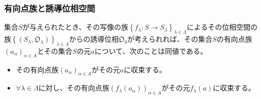 \documentclass[dvipdfmx]{jsarticle}
\begin{document}
\subsubsection{有向点族と誘導位相空間}%
\begin{thm}\label{8.1.9.10}
集合$S$が与えられたとき、その写像の族$\left\{ f_{\lambda}:S \rightarrow S_{\lambda} \right\}_{\lambda \in \varLambda}$によるその位相空間の族$\left\{ \left( S_{\lambda},\mathfrak{O}_{\lambda} \right) \right\}_{\lambda \in \varLambda}$からの誘導位相$\mathfrak{O}_{0}$が考えられれば、その集合$S$の有向点族$\left( a_{\alpha} \right)_{\alpha \in A}$とその集合$S$の元$a$について、次のことは同値である。
\begin{itemize}
\item
  その有向点族$\left( a_{\alpha} \right)_{\alpha \in A}$がその元$a$に収束する。
\item
  $\forall\lambda \in \varLambda$に対し、その有向点族$\left( f_{\lambda}\left( a_{\alpha} \right) \right)_{\alpha \in A}$がその元$f_{\lambda}(a)$に収束する。
\end{itemize}
\end{thm}
\end{document}
